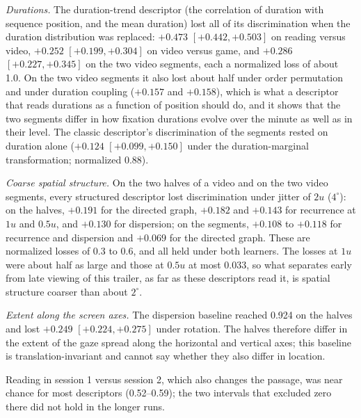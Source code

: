 \emph{Durations.} The duration-trend descriptor (the correlation of duration with sequence position, and the mean duration) lost all of its discrimination when the duration distribution was replaced: $+0.473$ $[+0.442, +0.503]$ on reading versus video, $+0.252$ $[+0.199, +0.304]$ on video versus game, and $+0.286$ $[+0.227, +0.345]$ on the two video segments, each a normalized loss of about 1.0. On the two video segments it also lost about half under order permutation and under duration coupling ($+0.157$ and $+0.158$), which is what a descriptor that reads durations as a function of position should do, and it shows that the two segments differ in how fixation durations evolve over the minute as well as in their level. The classic descriptor's discrimination of the segments rested on duration alone ($+0.124$ $[+0.099, +0.150]$ under the duration-marginal transformation; normalized 0.88).

\emph{Coarse spatial structure.} On the two halves of a video and on the two video segments, every structured descriptor lost discrimination under jitter of $2u$ ($4^\circ$): on the halves, $+0.191$ for the directed graph, $+0.182$ and $+0.143$ for recurrence at $1u$ and $0.5u$, and $+0.130$ for dispersion; on the segments, $+0.108$ to $+0.118$ for recurrence and dispersion and $+0.069$ for the directed graph. These are normalized losses of 0.3 to 0.6, and all held under both learners. The losses at $1u$ were about half as large and those at $0.5u$ at most 0.033, so what separates early from late viewing of this trailer, as far as these descriptors read it, is spatial structure coarser than about $2^\circ$.

\emph{Extent along the screen axes.} The dispersion baseline reached 0.924 on the halves and lost $+0.249$ $[+0.224, +0.275]$ under rotation. The halves therefore differ in the extent of the gaze spread along the horizontal and vertical axes; this baseline is translation-invariant and cannot say whether they also differ in location.

Reading in session 1 versus session 2, which also changes the passage, was near chance for most descriptors (0.52--0.59); the two intervals that excluded zero there did not hold in the longer runs.

